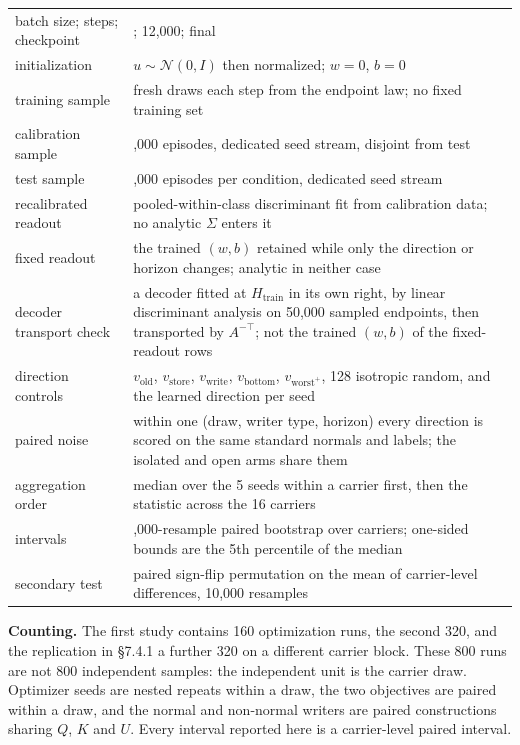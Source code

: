 \documentclass[
  10pt,
]{article}
\begin{document}
{\begin{longtable}[]{@{}
  >{\raggedright\arraybackslash}p{}
  >{\raggedright\arraybackslash}p{}@{}}
batch size; steps; checkpoint & 512; 12,000; final \\
initialization & \(u\sim\mathcal N(0,I)\) then normalized; \(w=0\),
\(b=0\) \\
training sample & fresh draws each step from the endpoint law; no fixed
training set \\
calibration sample & 50,000 episodes, dedicated seed stream, disjoint
from test \\
test sample & 50,000 episodes per condition, dedicated seed stream \\
recalibrated readout & pooled-within-class discriminant fit from
calibration data; no analytic \(\Sigma\) enters it \\
fixed readout & the trained \((w,b)\) retained while only the direction
or horizon changes; analytic in neither case \\
decoder transport check & a decoder fitted at \(H_{\text{train}}\) in
its own right, by linear discriminant analysis on 50,000 sampled
endpoints, then transported by \(A^{-\top}\); not the trained \((w,b)\)
of the fixed-readout rows \\
direction controls & \(v_{\text{old}}\), \(v_{\text{store}}\),
\(v_{\text{write}}\), \(v_{\text{bottom}}\), \(v_{\text{worst}^+}\), 128
isotropic random, and the learned direction per seed \\
paired noise & within one (draw, writer type, horizon) every direction
is scored on the same standard normals and labels; the isolated and open
arms share them \\
aggregation order & median over the 5 seeds within a carrier first, then
the statistic across the 16 carriers \\
intervals & 10,000-resample paired bootstrap over carriers; one-sided
bounds are the 5th percentile of the median \\
secondary test & paired sign-flip permutation on the mean of
carrier-level differences, 10,000 resamples \\
\end{longtable}
}

\textbf{Counting.} The first study contains 160 optimization runs, the
second 320, and the replication in §7.4.1 a further 320 on a different
carrier block. These 800 runs are not 800 independent samples: the
independent unit is the carrier draw. Optimizer seeds are nested repeats
within a draw, the two objectives are paired within a draw, and the
normal and non-normal writers are paired constructions sharing \(Q\),
\(K\) and \(U\). Every interval reported here is a carrier-level paired
interval.
\end{document}
